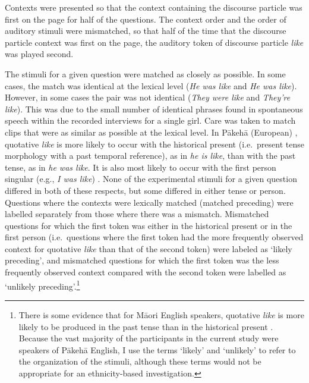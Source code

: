 Contexts were presented so that the context containing the discourse particle was first on the page for half of the questions. The context order and the order of auditory stimuli were mismatched, so that half of the time that the discourse particle context was first on the page, the auditory token of discourse particle \textit{like} was played second. 

The stimuli for a given question were matched as closely as possible. In some cases, the match was identical at the lexical level (\textit{He was like} and \textit{He was like}). However, in some cases the pair was not identical (\textit{They were like} and \textit{They're like}). This was due to the small number of identical phrases found in spontaneous speech within the recorded interviews for a single girl. Care was taken to match clips that were as similar as possible at the lexical level. In P\=akeh\=a (European) , quotative \textit{like} is more likely to occur with the historical present (i.e.~present tense morphology with a past temporal reference), as in \textit{he is like}, than with the past tense, as in \textit{he was like}. It is also most likely to occur with the first person singular (e.g., \textit{I was like}) \citep{buchstallerdarcy2009}. None of the experimental stimuli for a given question differed in both of these respects, but some differed in either tense or person. Questions where the contexts were lexically matched (matched preceding) were labelled separately from those where there was a mismatch. Mismatched questions for which the first token was either in the historical present or in the first person (i.e.~questions where the first token had the more frequently observed context for quotative \textit{like} than that of the second token) were labeled as `likely preceding', and mismatched questions for which the first token was the less frequently observed context compared with the second token were labelled as `unlikely preceding'.\footnote{There is some evidence that for M\=aori English speakers, quotative \textit{like} is more likely to be produced in the past tense than in the historical present \citep{darcy2010}. Because the vast majority of the participants in the current study were speakers of P\=akeh\=a English, I use the terms `likely' and `unlikely' to refer to the organization of the stimuli, although these terms would not be appropriate for an ethnicity-based investigation.}

